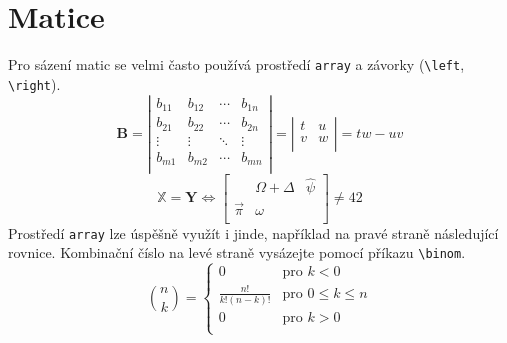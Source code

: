 \documentclass[twocolumn,a4paper,11pt]{article}
\theoremstyle{definition}
\theoremstyle{plain}
\begin{document}
\section{Matice}
\label{sec:matice}
Pro sázení matic se velmi často používá prostředí \verb|array| a závorky (\verb|\left|, \verb|\right|).
\[
\mathbf{B} = \left|
\begin{array}{cccc}
    b_{11} & b_{12} & \cdots & b_{1n} \\
    b_{21} & b_{22} & \cdots & b_{2n} \\
    \vdots & \vdots & \ddots & \vdots \\
    b_{m1} & b_{m2} & \cdots & b_{mn} \\
\end{array}
\right|
= \left|\begin{array}{cc}
    t & u \\
    v & w \\
\end{array}
\right| = tw-uv
\]
\[
\mathbb{X} = \mathbf{Y} \Longleftrightarrow \left[
\begin{array}{ccc}
    & \Omega + \Delta & \hat{\psi} \\
    \overrightarrow{\pi} & \omega & \\
\end{array}
\right] \neq 42
\]
Prostředí \verb|array| lze úspěšně využít i jinde, například na pravé straně následující rovnice.
Kombinační číslo na levé straně vysázejte pomocí příkazu \verb|\binom|.
\[
\binom{n}{k} = \left\{ 
\begin{array}{cl}
    0 & \text{pro } k<0 \\
    \frac{n!}{k!(n-k)!} & \text{pro } 0\leq k \leq n \\
    0 & \text{pro } k>0 \\
\end{array}
\right.
\]
\end{document}
